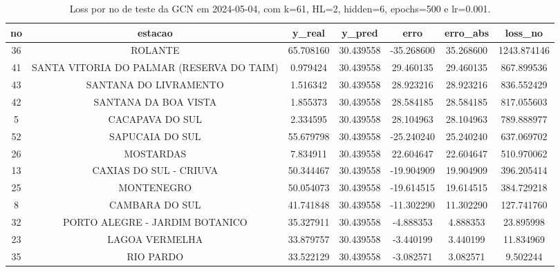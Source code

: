 \begin{table}[h]
\centering
\caption{Loss por no de teste da GCN em 2024-05-04, com k=61, HL=2, hidden=6, epochs=500 e lr=0.001.}
\label{tab:gcn_loss_k61_hl2_h6_e500_d20240504}
\begin{tabular}{ccccccc}
\toprule
no & estacao & y\_real & y\_pred & erro & erro\_abs & loss\_no \\
\midrule
36 & ROLANTE & 65.708160 & 30.439558 & -35.268600 & 35.268600 & 1243.874146 \\
41 & SANTA VITORIA DO PALMAR (RESERVA DO TAIM) & 0.979424 & 30.439558 & 29.460135 & 29.460135 & 867.899536 \\
43 & SANTANA DO LIVRAMENTO & 1.516342 & 30.439558 & 28.923216 & 28.923216 & 836.552429 \\
42 & SANTANA DA BOA VISTA & 1.855373 & 30.439558 & 28.584185 & 28.584185 & 817.055603 \\
5 & CACAPAVA DO SUL & 2.334595 & 30.439558 & 28.104963 & 28.104963 & 789.888977 \\
52 & SAPUCAIA DO SUL & 55.679798 & 30.439558 & -25.240240 & 25.240240 & 637.069702 \\
26 & MOSTARDAS & 7.834911 & 30.439558 & 22.604647 & 22.604647 & 510.970062 \\
13 & CAXIAS DO SUL - CRIUVA & 50.344467 & 30.439558 & -19.904909 & 19.904909 & 396.205414 \\
25 & MONTENEGRO & 50.054073 & 30.439558 & -19.614515 & 19.614515 & 384.729218 \\
8 & CAMBARA DO SUL & 41.741848 & 30.439558 & -11.302290 & 11.302290 & 127.741760 \\
32 & PORTO ALEGRE - JARDIM BOTANICO & 35.327911 & 30.439558 & -4.888353 & 4.888353 & 23.895998 \\
23 & LAGOA VERMELHA & 33.879757 & 30.439558 & -3.440199 & 3.440199 & 11.834969 \\
35 & RIO PARDO & 33.522129 & 30.439558 & -3.082571 & 3.082571 & 9.502244 \\
\bottomrule
\end{tabular}
\end{table}
